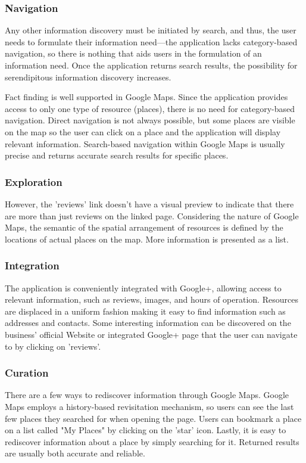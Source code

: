 {{{\subsubsection{Navigation}
  Any other information discovery must be initiated by search, and thus, the user needs to formulate their information need---the application lacks category-based navigation, so there is nothing that aids users in the formulation of an information need. Once the application returns search results, the possibility for serendipitous information discovery increases.  

Fact finding is well supported in Google Maps. Since the application provides access to only one type of resource (places), there is no need for category-based navigation. Direct navigation is not always possible, but some places are visible on the map so the user can click on a place and the application will display relevant information. Search-based navigation within Google Maps is usually precise and returns accurate search results for specific places. 
}
{\subsubsection{Exploration}
However, the 'reviews' link doesn't have a visual preview to indicate that there are more than just reviews on the linked page. Considering the nature of Google Maps, the semantic of the spatial arrangement of resources is defined by the locations of actual places on the map. More information is presented as a list. 
}
{\subsubsection{Integration}
The application is conveniently integrated with Google+, allowing access to relevant information, such as reviews, images, and hours of operation. Resources are displaced in a uniform fashion making it easy to find information such as addresses and contacts. Some interesting information can be discovered on the business' official Website or integrated Google+ page that the user can navigate to by clicking on 'reviews'.}
{\subsubsection{Curation}There are a few ways to rediscover information through Google Maps. Google Maps employs a history-based revisitation mechanism, so users can see the last few places they searched for when opening the page. Users can bookmark a place on a list called "My Places" by clicking on the 'star' icon. Lastly, it is easy to rediscover information about a place by simply searching for it. Returned results are usually both accurate and reliable.

}}}
